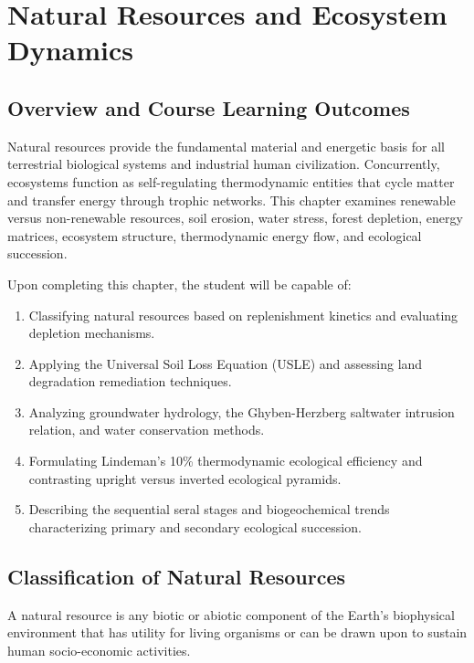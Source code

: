 \chapter{Natural Resources and Ecosystem Dynamics}
\label{chap:resources-ecosystems}

\section{Overview and Course Learning Outcomes}
Natural resources provide the fundamental material and energetic basis for all terrestrial biological systems and industrial human civilization. Concurrently, ecosystems function as self-regulating thermodynamic entities that cycle matter and transfer energy through trophic networks. This chapter examines renewable versus non-renewable resources, soil erosion, water stress, forest depletion, energy matrices, ecosystem structure, thermodynamic energy flow, and ecological succession.

\begin{important}
Upon completing this chapter, the student will be capable of:
\begin{enumerate}[leftmargin=1.5em]
    \item Classifying natural resources based on replenishment kinetics and evaluating depletion mechanisms.
    \item Applying the Universal Soil Loss Equation (USLE) and assessing land degradation remediation techniques.
    \item Analyzing groundwater hydrology, the Ghyben-Herzberg saltwater intrusion relation, and water conservation methods.
    \item Formulating Lindeman's 10\% thermodynamic ecological efficiency and contrasting upright versus inverted ecological pyramids.
    \item Describing the sequential seral stages and biogeochemical trends characterizing primary and secondary ecological succession.
\end{enumerate}
\end{important}

\section{Classification of Natural Resources}
\begin{definition}
A natural resource is any biotic or abiotic component of the Earth's biophysical environment that has utility for living organisms or can be drawn upon to sustain human socio-economic activities.
\end{definition}

